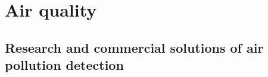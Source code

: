 \section{Air quality}

	
	
	
	
	
	
	
	

	\subsection{Research and commercial solutions of air pollution detection}





